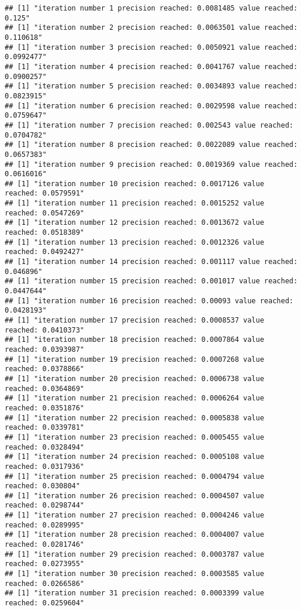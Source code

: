 \documentclass[
]{article}
\begin{document}
\begin{verbatim}
## [1] "iteration number 1 precision reached: 0.0081485 value reached: 0.125"
## [1] "iteration number 2 precision reached: 0.0063501 value reached: 0.110618"
## [1] "iteration number 3 precision reached: 0.0050921 value reached: 0.0992477"
## [1] "iteration number 4 precision reached: 0.0041767 value reached: 0.0900257"
## [1] "iteration number 5 precision reached: 0.0034893 value reached: 0.0823915"
## [1] "iteration number 6 precision reached: 0.0029598 value reached: 0.0759647"
## [1] "iteration number 7 precision reached: 0.002543 value reached: 0.0704782"
## [1] "iteration number 8 precision reached: 0.0022089 value reached: 0.0657383"
## [1] "iteration number 9 precision reached: 0.0019369 value reached: 0.0616016"
## [1] "iteration number 10 precision reached: 0.0017126 value reached: 0.0579591"
## [1] "iteration number 11 precision reached: 0.0015252 value reached: 0.0547269"
## [1] "iteration number 12 precision reached: 0.0013672 value reached: 0.0518389"
## [1] "iteration number 13 precision reached: 0.0012326 value reached: 0.0492427"
## [1] "iteration number 14 precision reached: 0.001117 value reached: 0.046896"
## [1] "iteration number 15 precision reached: 0.001017 value reached: 0.0447644"
## [1] "iteration number 16 precision reached: 0.00093 value reached: 0.0428193"
## [1] "iteration number 17 precision reached: 0.0008537 value reached: 0.0410373"
## [1] "iteration number 18 precision reached: 0.0007864 value reached: 0.0393987"
## [1] "iteration number 19 precision reached: 0.0007268 value reached: 0.0378866"
## [1] "iteration number 20 precision reached: 0.0006738 value reached: 0.0364869"
## [1] "iteration number 21 precision reached: 0.0006264 value reached: 0.0351876"
## [1] "iteration number 22 precision reached: 0.0005838 value reached: 0.0339781"
## [1] "iteration number 23 precision reached: 0.0005455 value reached: 0.0328494"
## [1] "iteration number 24 precision reached: 0.0005108 value reached: 0.0317936"
## [1] "iteration number 25 precision reached: 0.0004794 value reached: 0.030804"
## [1] "iteration number 26 precision reached: 0.0004507 value reached: 0.0298744"
## [1] "iteration number 27 precision reached: 0.0004246 value reached: 0.0289995"
## [1] "iteration number 28 precision reached: 0.0004007 value reached: 0.0281746"
## [1] "iteration number 29 precision reached: 0.0003787 value reached: 0.0273955"
## [1] "iteration number 30 precision reached: 0.0003585 value reached: 0.0266586"
## [1] "iteration number 31 precision reached: 0.0003399 value reached: 0.0259604"

\end{verbatim}
\end{document}
